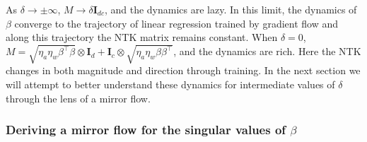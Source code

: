 \documentclass{article}
\theoremstyle{plain}
\theoremstyle{definition}
\theoremstyle{remark}
\begin{document}
As $\delta \to \pm \infty$,  $M \to \delta \mathbf{I}_{dc}$, and the dynamics are lazy.
%
In this limit, the dynamics of $\beta$ converge to the trajectory of linear regression trained by gradient flow and along this trajectory the NTK matrix remains constant.
%
When $\delta = 0$, $M = \sqrt{\eta_a \eta_w\beta^{\intercal}\beta} \otimes \mathbf{I}_d + \mathbf{I}_c \otimes \sqrt{\eta_a\eta_w \beta \beta^{\intercal}}$, and the dynamics are rich. 
%
Here the NTK changes in both magnitude and direction through training.
%
In the next section we will attempt to better understand these dynamics for intermediate values of $\delta$ through the lens of a mirror flow.




\subsubsection{Deriving a mirror flow for the singular values of \texorpdfstring{$\beta$}{}}
\label{app:wide-deep-linear-network-mirror}
\end{document}
